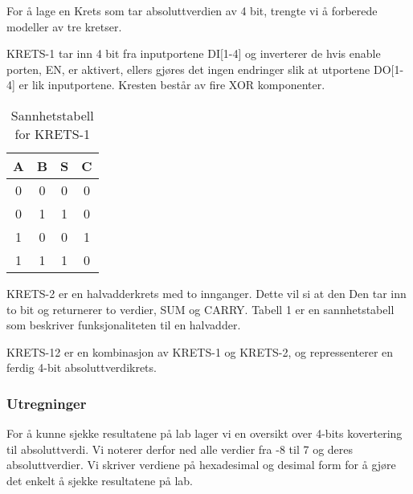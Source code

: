 \documentclass{article}
\begin{document}
For å lage en Krets som tar absoluttverdien av 4 bit, trengte vi å forberede modeller av tre kretser.

KRETS-1 tar inn 4 bit fra inputportene DI[1-4] og inverterer de hvis enable porten, EN, er aktivert, ellers gjøres det ingen endringer slik at utportene DO[1-4] er lik inputportene. Kresten består av fire XOR komponenter.

\begin{table}[h]
	\centering
	\caption{Sannhetstabell for KRETS-1}
	\label{tha-label}
	\vspace{0.2cm}
	\begin{tabular} {| c | c | c | c |} \hline
		A & B & S & C \\ \hline
		0 & 0 & 0 & 0 \\ \hline
		0 & 1 & 1 & 0 \\ \hline
		1 & 0 & 0 & 1 \\ \hline
		1 & 1 & 1 & 0 \\ \hline
	\end{tabular}
\end{table}


KRETS-2 er en halvadderkrets med to innganger. Dette vil si at den Den tar inn to bit og returnerer to verdier, SUM og CARRY. Tabell 1 er en sannhetstabell som beskriver funksjonaliteten til en halvadder.

KRETS-12 er en kombinasjon av KRETS-1 og KRETS-2, og repressenterer en ferdig 4-bit absoluttverdikrets.

\subsubsection{Utregninger}
For å kunne sjekke resultatene på lab lager vi en oversikt over 4-bits kovertering til absoluttverdi. Vi noterer derfor ned alle verdier fra -8 til 7 og deres absoluttverdier. Vi skriver verdiene på hexadesimal og desimal form for å gjøre det enkelt å sjekke resultatene på lab.
\end{document}
